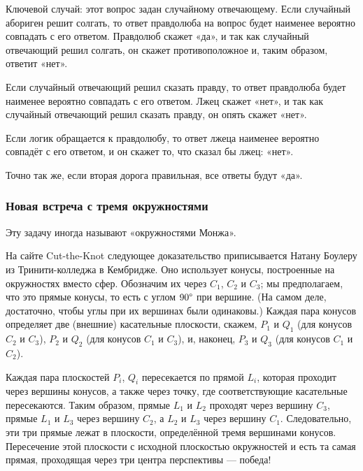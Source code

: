 Ключевой случай: этот вопрос задан случайному отвечающему.
Если случайный абориген решит солгать, то ответ правдолюба на вопрос будет наименее вероятно совпадать с его ответом.
Правдолюб скажет «да», и так как случайный отвечающий решил солгать, он скажет противоположное и, таким образом, ответит «нет».

Если случайный отвечающий решил сказать правду, то ответ правдолюба будет наименее вероятно совпадать с его ответом.
Лжец скажет «нет», и так как случайный отвечающий решил сказать правду, он опять скажет «нет».

Если логик обращается к правдолюбу, то ответ лжеца наименее вероятно совпадёт с его ответом, и он скажет то, что сказал бы лжец: «нет».

Точно так же, если вторая дорога правильная, все ответы будут «да».

\subsubsection*{Новая встреча с тремя окружностями}

Эту задачу иногда называют «окружностями Монжа».

На сайте Cut-the-Knot \cite{cut-the-knot} следующее доказательство приписывается Натану Боулеру из Тринити-колледжа в Кембридже.
Оно использует конусы, построенные на окружностях вместо сфер.
Обозначим их через $C_1$, $C_2$ и $C_3$; мы предполагаем, что это прямые конусы, то есть с углом $90\degree$ при вершине.
(На самом деле, достаточно, чтобы углы при их вершинах были одинаковы.)
Каждая пара конусов определяет две (внешние) касательные плоскости, скажем, $P_1$ и $Q_1$ (для конусов $C_2$ и $C_3$), $P_2$ и $Q_2$ (для конусов $C_1$ и $C_3$), и, наконец, $P_3$ и $Q_3$ (для конусов $C_1$ и $C_2$).

Каждая пара плоскостей $P_i$, $Q_i$ пересекается по прямой $L_i$, которая проходит через вершины конусов, а также через точку, где соответствующие касательные пересекаются.
Таким образом, прямые $L_1$ и $L_2$ проходят через вершину $C_3$,
прямые $L_1$ и $L_3$ через вершину $C_2$,
а $L_2$ и $L_3$ через вершину $C_1$.
Следовательно, эти три прямые лежат в плоскости, определённой тремя вершинами конусов. Пересечение этой плоскости с исходной плоскостью окружностей и есть та самая прямая, проходящая через три центра перспективы --- победа!


